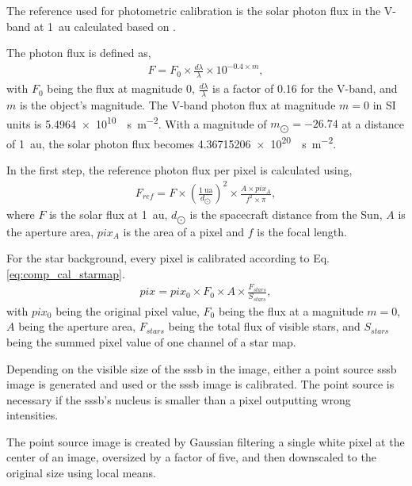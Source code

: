 The reference used for photometric calibration is the solar photon flux in the V-band at \SI{1}{\astronomicalunit} calculated based on \cite{wirth}.

The photon flux is defined as,
\begin{align}
    F = F_0 \times \frac{d\lambda}{\lambda} \times 10^{-0.4 \times m}, \label{eq:comp_flux_0mag}
\end{align}
with $F_0$ being the flux at magnitude 0, $\frac{d\lambda}{\lambda}$ is a factor of 0.16 for the V-band, and $m$ is the object's magnitude. The V-band photon flux at magnitude $m = 0$ in SI units is \SI{5.4964e10}{\per\second \per\square\meter}. With a magnitude of $m_{\bigodot} = -26.74$ at a distance of \SI{1}{\astronomicalunit}, the solar photon flux becomes \SI{4.36715206e+20}{\per\second\per\square\meter}.

In the first step, the reference photon flux per pixel is calculated using,
\begin{align}
        F_{ref} = F \times \left(\frac{\SI{1}{\astronomicalunit}}{d_{\bigodot}}\right)^2 \times \frac{A \times pix_A}{f^2 \times \pi}, \label{eq:comp_ref_flux}
\end{align}
where $F$ is the solar flux at \SI{1}{\astronomicalunit}, $d_{\bigodot}$ is the spacecraft distance from the Sun, $A$ is the aperture area, $pix_A$ is the area of a pixel and $f$ is the focal length.

For the star background, every pixel is calibrated according to Eq. \ref{eq:comp_cal_starmap}.
\begin{align}
        pix = pix_0 \times F_0 \times A \times \frac{F_{stars}}{S_{stars}}, \label{eq:comp_cal_starmap}
\end{align}
with $pix_0$ being the original pixel value, $F_0$ being the flux at a magnitude $m = 0$, $A$ being the aperture area, $F_{stars}$ being the total flux of visible stars, and $S_{stars}$ being the summed pixel value of one channel of a star map.

Depending on the visible size of the \gls{sssb} in the image, either a point source \gls{sssb} image is generated and used or the \gls{sssb} image is calibrated. The point source is necessary if the \gls{sssb}'s nucleus is smaller than a pixel outputting wrong intensities.

The point source image is created by Gaussian filtering a single white pixel at the center of an image, oversized by a factor of five, and then downscaled to the original size using local means.

